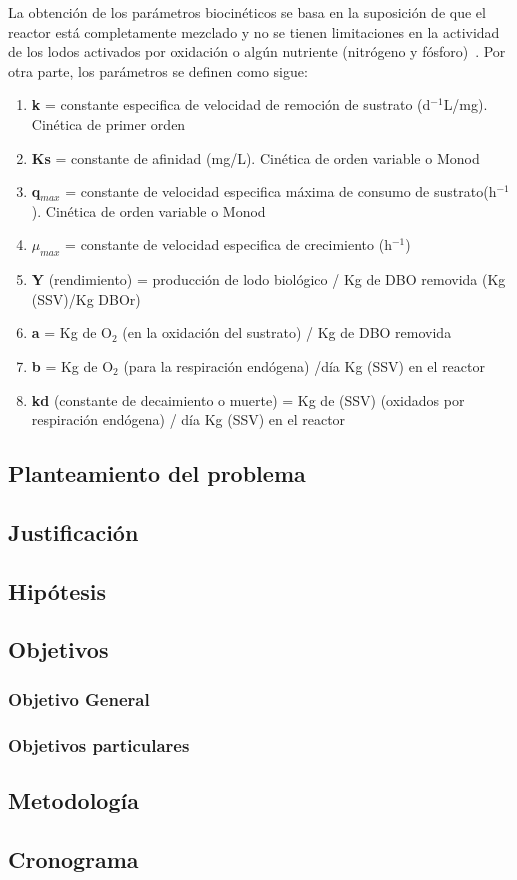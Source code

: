 La obtención de los parámetros biocinéticos se basa en la suposición de que el reactor está completamente mezclado y no se tienen limitaciones en la actividad de los lodos activados por oxidación o algún nutriente (nitrógeno y fósforo)~\citep{martinez2005}. Por otra parte, los parámetros se definen como sigue:
	\begin{small}	
	\begin{enumerate}[·]
	\item \textbf{k} = constante especifica de velocidad de remoción de sustrato (d$^{-1}$L/mg). Cinética de primer orden
	\item \textbf{Ks} = constante de afinidad (mg/L). Cinética de orden variable o Monod
	\item \textbf{q$_{max}$} = constante de velocidad especifica máxima de consumo de sustrato(h$^{-1}$). Cinética de orden variable o Monod
	\item \textbf{$\mu_{max}$} = constante de velocidad especifica de crecimiento (h$^{-1}$)
	\item \textbf{Y} (rendimiento) = producción de lodo biológico / Kg de DBO removida (Kg (SSV)/Kg DBOr)
	\item \textbf{a} = Kg de O$_{2}$ (en la oxidación del sustrato) / Kg de DBO removida
	\item \textbf{b} = Kg de O$_{2}$ (para la respiración endógena) /día Kg (SSV) en el reactor
	\item \textbf{kd} (constante de decaimiento o muerte) = Kg de (SSV) (oxidados por respiración endógena) / día Kg (SSV) en el reactor
	\end{enumerate}
	\end{small}

\subsection*{Planteamiento del problema}

\subsection*{Justificación}

\subsection*{Hipótesis}

\subsection*{Objetivos}
\subsubsection*{Objetivo General}

\subsubsection*{Objetivos particulares}

\subsection*{Metodología}

\subsection*{Cronograma}